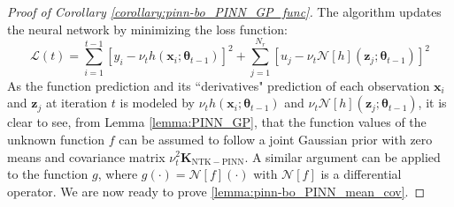 \begin{proof}[Proof of Corollary  \ref{corollary:pinn-bo_PINN_GP_func}]
The algorithm updates the neural network by minimizing the loss function: \begin{equation}
    \mathcal{L}(t) = \sum^{t-1}_{i=1} [y_i - \nu_t h(\mathbf{x}_i; \boldsymbol{\theta}_{t-1})]^2 + \sum^{N_r}_{j=1}[u_j - \nu_t \mathcal{N}[h](\mathbf{z}_j; \boldsymbol{\theta}_{t-1})]^2
\end{equation} 
As the function prediction and its ``derivatives" prediction of each observation $\mathbf{x}_i$ and $\mathbf{z}_j$ at iteration $t$ is modeled by $\nu_t h(\mathbf{x}_i; \boldsymbol{\theta}_{t-1})$ and $\nu_t \mathcal{N}[h](\mathbf{z}_j; \boldsymbol{\theta}_{t-1})$, it is clear to see, from Lemma \ref{lemma:PINN_GP}, that the function values of the unknown function $f$ can be assumed to follow a joint Gaussian prior with zero means and covariance matrix $\nu_t^2 \mathbf{K}_\mathrm{NTK-PINN}$. A similar argument can be applied to the function $g$, where $g(\cdot) = \mathcal{N}[f] (\cdot)$ with $\mathcal{N}[f]$ is a differential operator. We are now ready to prove \ref{lemma:pinn-bo_PINN_mean_cov}.
\end{proof} 
